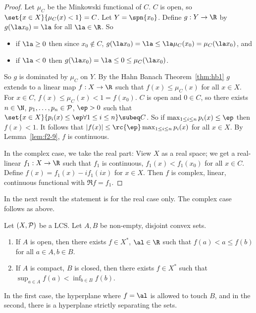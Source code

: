 \begin{proof}
Let $\mu_C$ be the Minkowski functional of $C$. $C$ is open, so $\set{x\in X}{\mu_C(x)<1}=C$. Let $Y=\spn\{x_0\}$. Define $g:Y\to \R$ by $g(\la x_0)=\la$ for all $\la\in \R$. So
\begin{itemize}
\item
if $\la\ge 0$ then since $x_0\nin C$, $g(\la x_0)=\la\le \la\mu_C(x_0)=\mu_C(\la x_0)$, and
\item
if $\la<0$ then $g(\la x_0)=\la\le 0\le \mu_C(\la x_0)$.
\end{itemize}
So $g$ is dominated by $\mu_C$ on $Y$. By the Hahn Banach Theorem~\ref{thm:hb1} $g$ extends to a linear map $f:X\to \R$ such that $f(x)\le \mu_C(x)$ for all $x\in X$. For $x\in C$, $f(x)\le \mu_C(x)<1=f(x_0)$. $C$ is open and $0\in C$, so there exists $n\in \N$, $p_1,\ldots, p_n\in \cal P$, $\ep>0$ such that $\set{x\in X}{p_i(x)\le \ep\forall 1\le i\le n}\subeq C$. 
So if $\max_{1\le i\le n} p_i(x)\le \ep$ then $f(x)<1$. It follows that $|f(x)|\le \rc{\ep}\max_{1\le i\le n}p_i(x)$ for all $x\in X$. By Lemma~\ref{lem:f2-9}, $f$ is continuous. %

In the complex case, we take the real part: View $X$ as a real space; we get a real-linear $f_1:X\to \R$ such that $f_1$ is continuous, $f_1(x)<f_1(x_0)$ for all $x\in C$. Define $f(x)=f_1(x)-if_1(ix)$ for $x\in X$. Then $f$ is complex, linear, continuous functional with $\Re f=f_1$.
\end{proof}
In the next result the statement is for the real case only. The complex case follows as above. 
\begin{thm}
Let $(X,\cal P)$ be a LCS. Let $A,B$ be non-empty, disjoint convex sets.
\begin{enumerate}
\item
If $A$ is open, then there exists $f\in X^*$, $\al\in \R$ such that $f(a)<a\le f(b)$ for all $a\in A,b\in B$. 
\item
If $A$ is compact, $B$ is closed, then there exists $f\in X^*$ such that $\sup_{a\in A} f(a)<\inf_{b\in B} f(b)$.
\end{enumerate}
\end{thm}
In the first case, the hyperplane where $f=\al$ is allowed to touch $B$, and in the second, there is a hyperplane strictly separating the sets.
